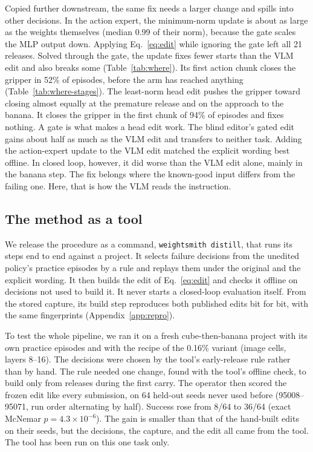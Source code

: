 \documentclass{article}
\begin{document}
Copied further downstream, the same fix needs a larger change and spills into other decisions. In the action expert, the minimum-norm update is about as large as the weights themselves (median 0.99 of their norm), because the gate scales the MLP output down. Applying Eq.~\eqref{eq:edit} while ignoring the gate left all 21 releases. Solved through the gate, the update fixes fewer starts than the VLM edit and also breaks some (Table~\ref{tab:where}). Its first action chunk closes the gripper in 52\% of episodes, before the arm has reached anything (Table~\ref{tab:where-stages}). The least-norm head edit pushes the gripper toward closing almost equally at the premature release and on the approach to the banana. It closes the gripper in the first chunk of 94\% of episodes and fixes nothing. A gate is what makes a head edit work. The blind editor's gated edit gains about half as much as the VLM edit and transfers to neither task. Adding the action-expert update to the VLM edit matched the explicit wording best offline. In closed loop, however, it did worse than the VLM edit alone, mainly in the banana step. The fix belongs where the known-good input differs from the failing one. Here, that is how the VLM reads the instruction.

\subsection{The method as a tool}
\label{sec:tool}
We release the procedure as a command, \texttt{weightsmith distill}, that runs its steps end to end against a project. It selects failure decisions from the unedited policy's practice episodes by a rule and replays them under the original and the explicit wording. It then builds the edit of Eq.~\eqref{eq:edit} and checks it offline on decisions not used to build it. It never starts a closed-loop evaluation itself. From the stored capture, its build step reproduces both published edits bit for bit, with the same fingerprints (Appendix~\ref{app:repro}).

To test the whole pipeline, we ran it on a fresh cube-then-banana project with its own practice episodes and with the recipe of the 0.16\% variant (image cells, layers 8--16). The decisions were chosen by the tool's early-release rule rather than by hand. The rule needed one change, found with the tool's offline check, to build only from releases during the first carry. The operator then scored the frozen edit like every submission, on 64 held-out seeds never used before (95008--95071, run order alternating by half). Success rose from 8/64 to 36/64 (exact McNemar $p=4.3\times10^{-6}$). The gain is smaller than that of the hand-built edits on their seeds, but the decisions, the capture, and the edit all came from the tool. The tool has been run on this one task only.
\end{document}
